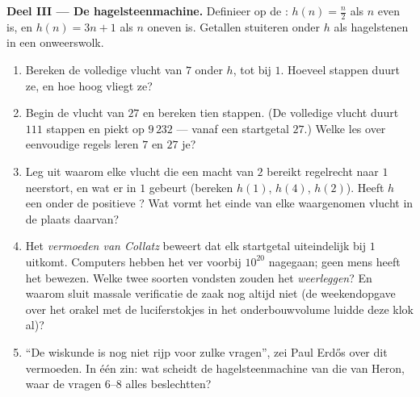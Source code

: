 \begin{problem}
\medskip
\noindent\textbf{Deel III --- De hagelsteenmachine.}
Definieer op de : $h(n) = \frac n2$ als $n$ even is, en
$h(n) = 3n + 1$ als $n$ oneven is. Getallen stuiteren onder $h$ als
hagelstenen in een onweerswolk.
\begin{enumerate}[resume]
  \item Bereken de volledige vlucht van $7$ onder $h$, tot bij $1$. Hoeveel
        stappen duurt ze, en hoe hoog vliegt ze?
  \item Begin de vlucht van $27$ en bereken tien stappen. (De volledige
        vlucht duurt $111$ stappen en piekt op $9\,232$ --- vanaf een
        startgetal $27$.) Welke les over eenvoudige regels leren $7$ en $27$
        je?
  \item Leg uit waarom elke vlucht die een macht van $2$ bereikt regelrecht
        naar $1$ neerstort, en wat er in $1$ gebeurt (bereken $h(1)$, $h(4)$,
        $h(2)$). Heeft $h$ een  onder de positieve ? Wat vormt het einde van elke waargenomen vlucht in de
        plaats daarvan?
  \item Het \emph{vermoeden van Collatz} beweert dat elk startgetal
        uiteindelijk bij $1$ uitkomt. Computers hebben het ver voorbij
        $10^{20}$ nagegaan; geen mens heeft het bewezen. Welke twee soorten
        vondsten zouden het \emph{weerleggen}? En waarom sluit massale
        verificatie de zaak nog altijd niet (de weekendopgave over het orakel
        met de luciferstokjes in het onderbouwvolume luidde deze klok al)?
  \item ``De wiskunde is nog niet rijp voor zulke vragen'', zei Paul
        Erd\H{o}s over dit vermoeden. In één zin: wat scheidt de
        hagelsteenmachine van die van Heron, waar de vragen 6--8 alles
        beslechtten?
\end{enumerate}


\end{problem}
